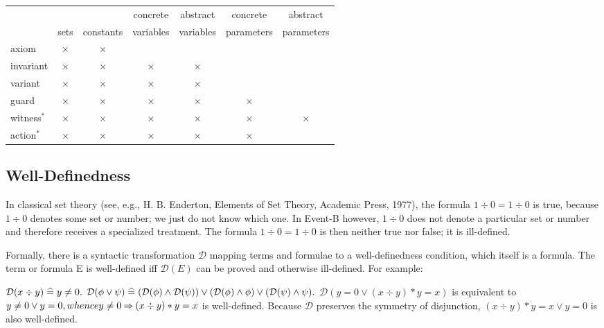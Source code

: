 \begin{center}
  \newcommand{\markcell}{$\times$}
  \begin{tabular}{lcccccc}
  \hline
            &           &           & concrete  & abstract  & concrete   & abstract \\
            & sets      & constants & variables & variables & parameters & parameters \\
  \hline
  axiom     & \markcell & \markcell &           &           &            & \\
  invariant & \markcell & \markcell & \markcell & \markcell &            & \\
  variant   & \markcell & \markcell & \markcell & \markcell &            & \\
  guard     & \markcell & \markcell & \markcell & \markcell & \markcell  & \\
  witness$^{*}$   & \markcell & \markcell & \markcell & \markcell & \markcell  & \markcell \\
  action$^{*}$    & \markcell & \markcell & \markcell & \markcell & \markcell  &  \\
  \hline
  \end{tabular}    
\end{center}


\subsection{Well-Definedness}

In classical set theory (see, e.g., H. B. Enderton, Elements of Set Theory, Academic Press, 1977), the formula $1\div 0 = 1\div 0$ is true, because $1\div 0$ denotes some set or number; we just do not know which one. In Event-B however, $1\div 0$ does not denote a particular set or number and therefore receives a specialized treatment. The formula $1\div 0 = 1\div 0$ is then neither true nor false; it is ill-defined.

Formally, there is a syntactic transformation $\mathcal{D}$ mapping terms and formulae to a well-definedness condition, which itself is a formula. The term or formula E is well-defined iff $\mathcal{D}(E)$ can be proved and otherwise ill-defined. For example:

    $\mathcal{D}(x\div y) \mathrel{\widehat=} y \neq 0.$
    $\mathcal{D}(\phi\lor\psi)\mathrel{\widehat=}(\mathcal{D}(\phi)\land\mathcal{D}(\psi))\lor(\mathcal{D}(\phi)\land\phi)\lor(\mathcal{D}(\psi)\land\psi).$
    $\mathcal{D}(y=0 \lor (x\div y) * y = x)$ is equivalent to $y\neq0 \lor y = 0, whence y\neq0\mathbin\Rightarrow(x\div y)*y=x$ is well-defined.
    Because $\mathcal{D}$ preserves the symmetry of disjunction, $(x\div y)*y=x \lor y = 0$ is also well-defined. 

